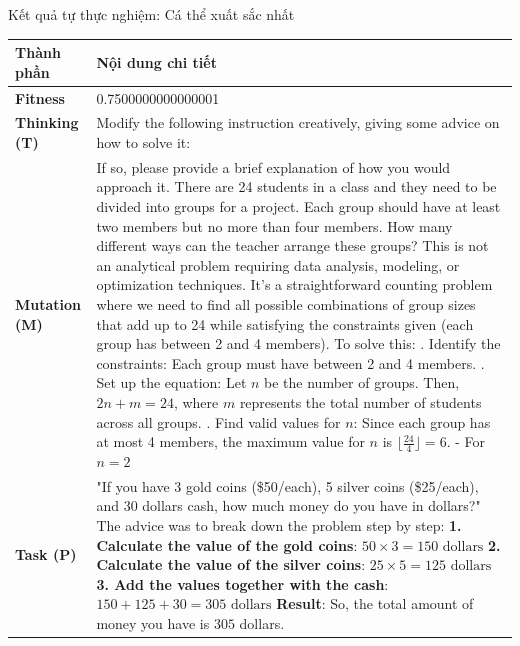 \documentclass[english,main=vietnamese,xcolor=table]{beamer}
\begin{document}
\begin{frame}{Kết quả tự thực nghiệm: Cá thể xuất sắc nhất}
\tiny
\centering
\renewcommand{\arraystretch}{1.5} %

\begin{tabular}{|l|p{9.5cm}|}
\hline
\rowcolor{blue!20} \textbf{Thành phần} & \textbf{Nội dung chi tiết} \\ \hline

\textbf{Fitness} & 0.7500000000000001 \\ \hline
\textbf{Thinking (T)} & Modify the following instruction creatively, giving some advice on how to solve it: \\ \hline
\textbf{Mutation (M)} & 
If so, please provide a brief explanation of how you would approach it.
\newline There are 24 students in a class and they need to be divided into groups for a project. Each group should have at least two members but no more than four members. How many different ways can the teacher arrange these groups?
\newline This is not an analytical problem requiring data analysis, modeling, or optimization techniques. It's a straightforward counting problem where we need to find all possible combinations of group sizes that add up to 24 while satisfying the constraints given (each group has between 2 and 4 members).
\newline To solve this:
\newline 1. Identify the constraints: Each group must have between 2 and 4 members.
\newline 2. Set up the equation: Let $n$ be the number of groups. Then, $2n + m = 24$, where $m$ represents the total number of students across all groups.
\newline 3. Find valid values for $n$: Since each group has at most 4 members, the maximum value for $n$ is $\lfloor \frac{24}{4} \rfloor = 6$.
\newline - For $n = 2$ \\ \hline

\textbf{Task (P)} & 
"If you have 3 gold coins (\$50/each), 5 silver coins (\$25/each), and 30 dollars cash, how much money do you have in dollars?" 
\newline The advice was to break down the problem step by step:
\newline \textbf{1. Calculate the value of the gold coins}: $50 \times 3 = 150 \text{ dollars}$
\newline \textbf{2. Calculate the value of the silver coins}: $25 \times 5 = 125 \text{ dollars}$
\newline \textbf{3. Add the values together with the cash}: $150 + 125 + 30 = 305 \text{ dollars}$
\newline \textbf{Result}: So, the total amount of money you have is $\boxed{305}$ dollars. \\ \hline


\end{tabular}
\end{frame}
\end{document}
